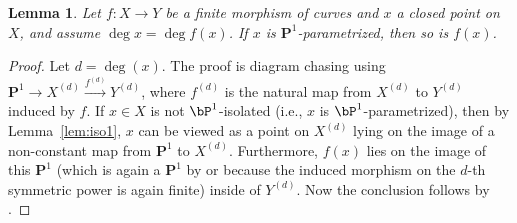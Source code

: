 \documentclass[11pt,reqno]{amsart}
\theoremstyle{plain}
\newtheorem{lemma}[theorem]{Lemma}
\theoremstyle{definition}
\newcommand{\PP}{\mathbf P}
\begin{document}
\begin{lemma} \label{lem:iso2}
Let $f\colon X\rightarrow Y$ be a finite morphism of curves and $x$ a closed point on $X$, and assume  $\deg x = \deg f(x)$. If $x$ is $\PP^1$-parametrized, then so is $f(x)$.
\end{lemma}
\begin{proof}
Let $d=\deg(x)$. The proof is diagram chasing using $\PP^1 \to X^{(d)}\stackrel{f^{(d)}}{\to} Y^{(d)}$, where $f^{(d)}$ is the natural map from $X^{(d)}$ to $Y^{(d)}$ induced by $f$.
If $x\in X$ is not $\bP^1$-isolated (i.e., $x$ is $\bP^1$-parametrized), then
by Lemma~\ref{lem:iso1}, $x$ can be viewed as a point on $X^{(d)}$ lying on the image of a non-constant map from $\PP^1$ to $X^{(d)}$.  
Furthermore, $f(x)$ lies on the image of this $\PP^1$ (which is again a $\PP^1$ by  or because the induced morphism on the $d$-th symmetric power is again finite) inside of $Y^{(d)}$. Now the conclusion follows by .
\end{proof}
\end{document}
